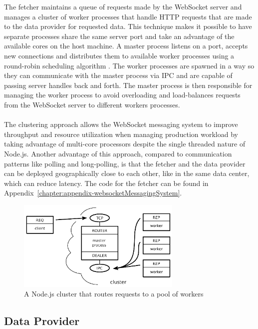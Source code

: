 The fetcher maintains a queue of requests made by the WebSocket server and manages a cluster of worker processes that handle HTTP requests that are made to the data provider for requested data. This technique makes it possible to have separate processes share the same server port and take an advantage of the available cores on the host machine. A master process listens on a port, accepts new connections and distributes them to available worker processes using a round-robin scheduling algorithm \cite{nodeCluster}. The worker processes are spawned in a way so they can communicate with the master process via IPC and are capable of passing server handles back and forth. The master process is then responsible for managing the worker process to avoid overloading and load-balances requests from the WebSocket server to different workers processes.
\\ \\
The clustering approach allows the WebSocket messaging system to improve throughput and resource utilization when managing production workload by taking advantage of multi-core processors despite the single threaded nature of Node.js. Another advantage of this approach, compared to communication patterns like polling and long-polling, is that the fetcher and the data provider can be deployed geographically close to each other, like in the same data center, which can reduce latency. The code for the fetcher can be found in Appendix~\ref{chapter:appendix-websocketMessagingSystem}.
\\
\begin{figure}[h!]
	\centering
	\label{fig:webSocketMessagingSystem}\includegraphics[width=0.7\textwidth]{images/poolOfWorkers}
	\caption{A Node.js cluster that routes requests to a pool of workers \cite{judd2008node}}
\end{figure}

\subsection{Data Provider}

